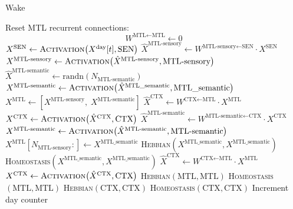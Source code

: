 \documentclass{article}
\begin{document}
\begin{algorithm}[h!]
\caption{Wake}\label{alg:wake}
\begin{algorithmic}[1]
        \State Reset MTL recurrent connections:
            \[
                W^{\textrm{MTL} \leftarrow \textrm{MTL}} \gets 0
            \]
        \State $X^{\textrm{SEN}} \gets \textsc{Activation}\bigl(X^{\textrm{day}}[t], \textrm{SEN}\bigr)$
        \State $\hat{X}^{\textrm{MTL-sensory}} 
            \gets 
            W^{\textrm{MTL-sensory} \leftarrow \textrm{SEN}} 
            \cdot X^{\textrm{SEN}}$
        \State $X^{\textrm{MTL-sensory}} 
            \gets 
            \textsc{Activation}\bigl(\hat{X}^{\textrm{MTL-sensory}}, \textrm{MTL-sensory}\bigr)$
        \State $\hat{X}^{\textrm{MTL-semantic}} 
            \gets 
            \text{randn}(N_\textrm{MTL-semantic})$
        \State $X^{\textrm{MTL-semantic}} 
            \gets 
            \textsc{Activation}\bigl(\hat{X}^{\textrm{MTL\_semantic}}, \textrm{MTL\_semantic}\bigr)$
        \State $X^{\textrm{MTL}} 
            \gets 
            [X^{\textrm{MTL-sensory}}, \; X^{\textrm{MTL-semantic}}]$
        \State $\hat{X}^{\textrm{CTX}} 
            \gets 
            W^{\textrm{CTX} \leftarrow \textrm{MTL}} 
            \cdot X^{\textrm{MTL}}$
        \State $X^{\textrm{CTX}} 
            \gets 
            \textsc{Activation}\bigl(\hat{X}^{\textrm{CTX}}, \textrm{CTX}\bigr)$
            \State $\hat{X}^{\textrm{MTL-semantic}} 
                \gets 
                W^{\textrm{MTL-semantic} \leftarrow \textrm{CTX}} 
                \cdot X^{\textrm{CTX}}$
            \State $X^{\textrm{MTL-semantic}} 
                \gets 
                \textsc{Activation}\bigl(\hat{X}^{\textrm{MTL-semantic}}, \textrm{MTL-semantic}\bigr)$
            \State $X^{\textrm{MTL}}[N_\textrm{MTL-sensory}:] 
                \gets 
                X^{\textrm{MTL\_semantic}}$
            \State \textsc{Hebbian}$(X^{\textrm{MTL\_semantic}}, X^{\textrm{MTL\_semantic}})$
            \State \textsc{Homeostasis}$(X^{\textrm{MTL\_semantic}}, X^{\textrm{MTL\_semantic}})$
        \EndIf
            \State $\hat{X}^{\textrm{CTX}} 
                \gets 
                W^{\textrm{CTX} \leftarrow \textrm{MTL}} 
                \cdot X^{\textrm{MTL}}$
            \State $X^{\textrm{CTX}} 
                \gets 
                \textsc{Activation}\bigl(\hat{X}^{\textrm{CTX}}, \textrm{CTX}\bigr)$
        \EndIf
        \State \textsc{Hebbian}$(\textrm{MTL}, \textrm{MTL})$
        \State \textsc{Homeostasis}$(\textrm{MTL}, \textrm{MTL})$
        \State \textsc{Hebbian}$(\textrm{CTX}, \textrm{CTX})$
        \State \textsc{Homeostasis}$(\textrm{CTX}, \textrm{CTX})$
    \EndFor
    \State Increment day counter
\EndFunction
\end{algorithmic}
\end{algorithm}
\end{document}
